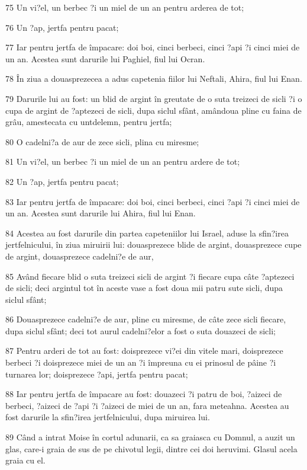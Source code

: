\par 75 Un vi?el, un berbec ?i un miel de un an pentru arderea de tot;
\par 76 Un ?ap, jertfa pentru pacat;
\par 77 Iar pentru jertfa de împacare: doi boi, cinci berbeci, cinci ?api ?i cinci miei de un an. Acestea sunt darurile lui Paghiel, fiul lui Ocran.
\par 78 În ziua a douasprezecea a adus capetenia fiilor lui Neftali, Ahira, fiul lui Enan.
\par 79 Darurile lui au fost: un blid de argint în greutate de o suta treizeci de sicli ?i o cupa de argint de ?aptezeci de sicli, dupa siclul sfânt, amândoua pline cu faina de grâu, amestecata cu untdelemn, pentru jertfa;
\par 80 O cadelni?a de aur de zece sicli, plina cu miresme;
\par 81 Un vi?el, un berbec ?i un miel de un an pentru ardere de tot;
\par 82 Un ?ap, jertfa pentru pacat;
\par 83 Iar pentru jertfa de împacare: doi boi, cinci berbeci, cinci ?api ?i cinci miei de un an. Acestea sunt darurile lui Ahira, fiul lui Enan.
\par 84 Acestea au fost darurile din partea capeteniilor lui Israel, aduse la sfin?irea jertfelnicului, în ziua miruirii lui: douasprezece blide de argint, douasprezece cupe de argint, douasprezece cadelni?e de aur,
\par 85 Având fiecare blid o suta treizeci sicli de argint ?i fiecare cupa câte ?aptezeci de sicli; deci argintul tot în aceste vase a fost doua mii patru sute sicli, dupa siclul sfânt;
\par 86 Douasprezece cadelni?e de aur, pline cu miresme, de câte zece sicli fiecare, dupa siclul sfânt; deci tot aurul cadelni?elor a fost o suta douazeci de sicli;
\par 87 Pentru arderi de tot au fost: doisprezece vi?ei din vitele mari, doisprezece berbeci ?i doisprezece miei de un an ?i împreuna cu ei prinosul de pâine ?i turnarea lor; doisprezece ?api, jertfa pentru pacat;
\par 88 Iar pentru jertfa de împacare au fost: douazeci ?i patru de boi, ?aizeci de berbeci, ?aizeci de ?api ?i ?aizeci de miei de un an, fara meteahna. Acestea au fost darurile la sfin?irea jertfelnicului, dupa miruirea lui.
\par 89 Când a intrat Moise în cortul adunarii, ca sa graiasca cu Domnul, a auzit un glas, care-i graia de sus de pe chivotul legii, dintre cei doi heruvimi. Glasul acela graia cu el.

